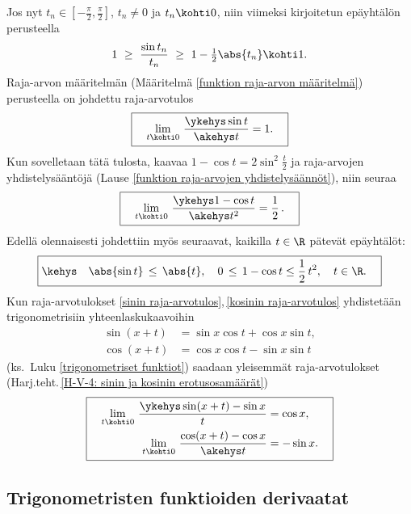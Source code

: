 Jos nyt $t_n\in [-\tfrac{\pi}{2},\tfrac{\pi}{2}]$, $t_n\neq 0$ ja $t_n\kohti 0$, niin viimeksi
kirjoitetun epäyhtälön perusteella
\[
1\ \ge\ \frac{\sin t_n}{t_n}\ \ge\ 1-\tfrac{1}{2}\abs{t_n} \kohti 1.
\]
Raja-arvon määritelmän (Määritelmä \ref{funktion raja-arvon määritelmä}) perusteella on 
johdettu raja-arvotulos
\begin{equation} \label{sinin raja-arvotulos}
\boxed{\quad \lim_{t\kohti 0}\,\frac{\ykehys\sin t}{\akehys t}=1. \quad}
\end{equation}
Kun sovelletaan tätä tulosta, kaavaa $1-\cos t=2\sin^2\tfrac{t}{2}$ ja raja-arvojen
yhdistelysääntöjä (Lause \ref{funktion raja-arvojen yhdistelysäännöt}), niin seuraa
\begin{equation} \label{kosinin raja-arvotulos}
\boxed{\quad \lim_{t\kohti 0}\,\frac{\ykehys 1-\cos t}{\akehys t^2}=\frac{1}{2}\,. \quad}
\end{equation}
Edellä olennaisesti johdettiin myös seuraavat, kaikilla $t\in\R$ pätevät epäyhtälöt:
\[
\boxed{\kehys\quad \abs{\sin t}\,\le\,\abs{t}, \quad 
                   0\,\le\,1-\cos t \le \frac{1}{2}\,t^2, \quad t\in\R. \quad}
\]
Kun raja-arvotulokset \eqref{sinin raja-arvotulos},\,\eqref{kosinin raja-arvotulos} yhdistetään
trigonometrisiin yhteenlaskukaavoihin
\begin{align*}
\sin (x+t) &=\sin x\cos t+\cos x\sin t, \\
\cos (x+t) &=\cos x\cos t-\sin x\sin t
\end{align*}
(ks.\ Luku \ref{trigonometriset funktiot}) saadaan yleisemmät raja-arvotulokset
(Harj.teht.\,\ref{H-V-4: sinin ja kosinin erotusosamäärät})
\begin{equation} \label{sinin ja kosinin erotusosamäärät}
\boxed{\begin{aligned}
\quad \lim_{t\kohti 0}\,\frac{\ykehys \sin(x+t)-\sin x}{t} &= \cos x, \\
       \lim_{t\kohti 0}\,\frac{\cos(x+t)-\cos x}{\akehys t}&= -\sin x. \quad
\end{aligned}}
\end{equation}

\subsection*{Trigonometristen funktioiden derivaatat}

